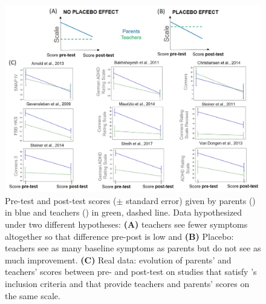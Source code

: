 \begin{figure}[h!]
  \centering
  \includegraphics[width=1.0\linewidth]{figures/discussion_on_placebo_effect_colors_2-columns_fitting_image.jpg}
  \caption{Pre-test and post-test scores ($\pm$ standard error) given by parents () in blue and teachers () in green, dashed line. 
	Data hypothesized under two different hypotheses: \textbf{(A)} teachers see fewer symptoms altogether so that difference pre-post is low and \textbf{(B)}
	Placebo: teachers see as many baseline symptoms as parents but do not see as much improvement. \textbf{(C)} Real data: evolution of parents' 
	and teachers' scores between pre- and post-test on studies that satisfy \citeauthor{Cortese2016}'s inclusion criteria and that provide teachers and parents'
	scores on the same scale.}
  \label{Figure:discussion_on_placebo_effect_colors_2-columns_fitting_image}
\end{figure} 
